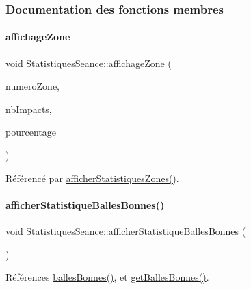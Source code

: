 \subsubsection{Documentation des fonctions membres}
\mbox{\label{class_statistiques_seance_a956ac10424a167d5b64fe13a92fbf121}} 
\paragraph{\texorpdfstring{affichage\+Zone}{affichageZone}}
{\footnotesize\ttfamily void Statistiques\+Seance\+::affichage\+Zone (\begin{DoxyParamCaption}\item[{int}]{numero\+Zone,  }\item[{int}]{nb\+Impacts,  }\item[{Q\+String}]{pourcentage }\end{DoxyParamCaption})\hspace{0.3cm}{\ttfamily [signal]}}



Référencé par \hyperlink{class_statistiques_seance_afd9087c34222c0b2c0db11c5a96459c4}{afficher\+Statistiques\+Zones()}.

\mbox{\label{class_statistiques_seance_a712aad34b7ff7dd550ac6c976f75f416}} 
\paragraph{\texorpdfstring{afficher\+Statistique\+Balles\+Bonnes()}{afficherStatistiqueBallesBonnes()}}
{\footnotesize\ttfamily void Statistiques\+Seance\+::afficher\+Statistique\+Balles\+Bonnes (\begin{DoxyParamCaption}{ }\end{DoxyParamCaption})}



Références \hyperlink{class_statistiques_seance_aa3ee6b00dae44d1f3cf78349ba235b08}{balles\+Bonnes()}, et \hyperlink{class_statistiques_seance_a0dad2ceb22672adf343548b35bf86ba1}{get\+Balles\+Bonnes()}.



